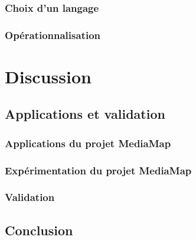 \section{Choix d'un langage}\label{sec:ln}
\section{Opérationnalisation}\label{sec:op}




\part*{Discussion}
\chapter{Applications et validation}\label{chap:app}
\section{Applications du projet MediaMap}\label{sec:app}
\section{Expérimentation du projet MediaMap}\label{sec:xp}
\section{Validation}\label{sec:val}

\chapter*{Conclusion}\label{chap:cc}

